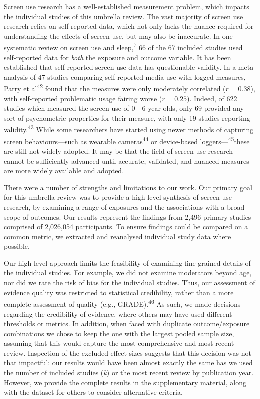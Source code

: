 \documentclass[
  english,
  man]{apa6}
\begin{document}
Screen use research has a well-established measurement problem, which impacts the individual studies of this umbrella review.
The vast majority of screen use research relies on self-reported data, which not only lacks the nuance required for understanding the effects of screen use, but may also be inaccurate.
In one systematic review on screen use and sleep,\textsuperscript{7} 66 of the 67 included studies used self-reported data for \emph{both} the exposure and outcome variable.
It has been established that self-reported screen use data has questionable validity.
In a meta-analysis of 47 studies comparing self-reported media use with logged measures, Parry et al\textsuperscript{42} found that the measures were only moderately correlated (\(r = 0.38\)), with self-reported problematic usage fairing worse (\(r = 0.25\)).
Indeed, of 622 studies which measured the screen use of 0---6 year-olds, only 69 provided any sort of psychometric properties for their measure, with only 19 studies reporting validity.\textsuperscript{43}
While some researchers have started using newer methods of capturing screen behaviours---such as wearable cameras\textsuperscript{44} or device-based loggers---\textsuperscript{45}these are still not widely adopted.
It may be that the field of screen use research cannot be sufficiently advanced until accurate, validated, and nuanced measures are more widely available and adopted.

There were a number of strengths and limitations to our work.
Our primary goal for this umbrella review was to provide a high-level synthesis of screen use research, by examining a range of exposures and the associations with a broad scope of outcomes.
Our results represent the findings from 2,496 primary studies comprised of 2,026,054 participants.
To ensure findings could be compared on a common metric, we extracted and reanalysed individual study data where possible.

Our high-level approach limits the feasibility of examining fine-grained details of the individual studies.
For example, we did not examine moderators beyond age, nor did we rate the risk of bias for the individual studies.
Thus, our assessment of evidence quality was restricted to statistical credibility, rather than a more complete assessment of quality (e.g., GRADE).\textsuperscript{46}
As such, we made decisions regarding the credibility of evidence, where others may have used different thresholds or metrics.
In addition, when faced with duplicate outcome/exposure combinations we chose to keep the one with the largest pooled sample size, assuming that this would capture the most comprehensive and most recent review.
Inspection of the excluded effect sizes suggests that this decision was not that impactful: our results would have been almost exactly the same has we used the number of included studies (\emph{k}) or the most recent review by publication year.
However, we provide the complete results in the supplementary material, along with the dataset for others to consider alternative criteria.
\end{document}
